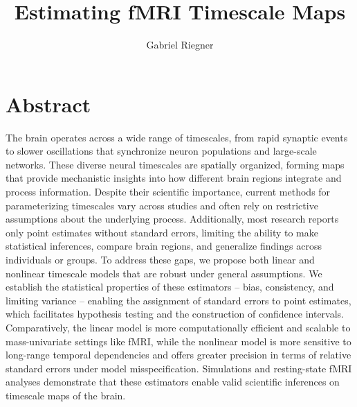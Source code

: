 \documentclass[9pt]{article}
\title{Estimating fMRI Timescale Maps}
\author{Gabriel Riegner}
\begin{document}
\maketitle

\section*{Abstract}
The brain operates across a wide range of timescales, from rapid synaptic events to slower oscillations that synchronize neuron populations and large-scale networks. These diverse neural timescales are spatially organized, forming maps that provide mechanistic insights into how different brain regions integrate and process information. Despite their scientific importance, current methods for parameterizing timescales vary across studies and often rely on restrictive assumptions about the underlying process. Additionally, most research reports only point estimates without standard errors, limiting the ability to make statistical inferences, compare brain regions, and generalize findings across individuals or groups. To address these gaps, we propose both linear and nonlinear timescale models that are robust under general assumptions. We establish the statistical properties of these estimators -- bias, consistency, and limiting variance -- enabling the assignment of standard errors to point estimates, which facilitates hypothesis testing and the construction of confidence intervals. Comparatively, the linear model is more computationally efficient and scalable to mass-univariate settings like fMRI, while the nonlinear model is more sensitive to long-range temporal dependencies and offers greater precision in terms of relative standard errors under model misspecification. Simulations and resting-state fMRI analyses demonstrate that these estimators enable valid scientific inferences on timescale maps of the brain.





% 


\end{document}
